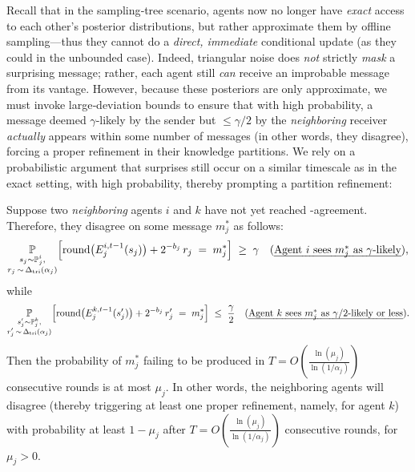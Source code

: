 Recall that in the sampling‐tree scenario, agents now no longer have \emph{exact} access to each other's posterior distributions, but rather approximate them by offline sampling---thus they cannot do a \emph{direct, immediate} conditional update (as they could in the unbounded case). 
Indeed, triangular noise does \emph{not} strictly \emph{mask} a surprising message; rather, each agent still \emph{can} receive an improbable message from its vantage. 
However, because these posteriors are only approximate, we must invoke large‐deviation bounds to ensure that with high probability, a message deemed $\gamma$‐likely by the sender but $\leq\gamma/2$ by the \emph{neighboring} receiver 
\emph{actually} appears within some number of messages (in other words, they disagree), forcing a proper refinement in their knowledge partitions. 
We rely on a probabilistic argument that surprises still occur on a similar timescale as in the exact setting, with high probability, thereby prompting a partition refinement:
\begin{lemma}
\label{lem:sample-tree-neighbor-msg-refinment}
Suppose two \emph{neighboring} agents $i$ and $k$ have not yet reached \agree-agreement.
Therefore, they disagree on some message $m_j^*$ as follows: %
\begin{equation}\label{eq:disagree-prob}
\operatorname*{\mathbb{P}}_{\substack{s_j\sim \mathbb{P}^i_j,\\
    r_j \,\sim\,\Delta_{\mathrm{tri}}(\alpha_j)}}
  \Bigl[\mathrm{round}\bigl(E^{i,t-1}_j(s_j)\bigr)
    + 2^{-b_j}\,r_j \;=\; m_j^*\Bigr]
  \;\ge\;\gamma
\quad\text{(\emph{Agent $i$ sees $m_j^*$ as $\gamma$‐likely})},
\end{equation}
while
\begin{equation}\label{eq:disagree-prob2}
\operatorname*{\mathbb{P}}_{\substack{s'_j\sim \mathbb{P}^k_j,\\
    r'_j \,\sim\,\Delta_{\mathrm{tri}}(\alpha_j)}}
  \Bigl[\mathrm{round}\bigl(E^{k,t-1}_j(s'_j)\bigr)
    + 2^{-b_j}\,r'_j \;=\; m_j^*\Bigr]
  \;\le\;\frac{\gamma}{2}
\quad\text{(\emph{Agent $k$ sees $m_j^*$ as $\gamma/2$‐likely or less}).}
\end{equation}
Then the probability of $m_j^*$ failing to be produced in $T = O\left(\frac{\ln\left(\mu_j\right)}{\ln\left(1/\alpha_j\right)}\right)$ consecutive rounds is at most $\mu_j$.
In other words, the neighboring agents will disagree (thereby triggering at least one proper refinement, namely, for agent $k$) with probability at least $1-\mu_j$ after $T = O\left(\frac{\ln\left(\mu_j\right)}{\ln\left(1/\alpha_j\right)}\right)$ consecutive rounds, for $\mu_j > 0$.
\end{lemma}
